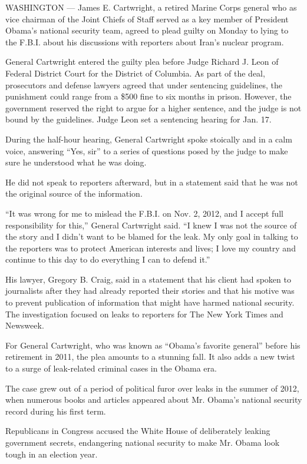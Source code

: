 WASHINGTON --- James E. Cartwright, a retired Marine Corps general who
as vice chairman of the Joint Chiefs of Staff served as a key member of
President Obama's national security team, agreed to plead guilty on
Monday to lying to the F.B.I. about his discussions with reporters about
Iran's nuclear program.

General Cartwright entered the guilty plea before Judge Richard J. Leon
of Federal District Court for the District of Columbia. As part of the
deal, prosecutors and defense lawyers agreed that under sentencing
guidelines, the punishment could range from a \$500 fine to six months
in prison. However, the government reserved the right to argue for a
higher sentence, and the judge is not bound by the guidelines. Judge
Leon set a sentencing hearing for Jan. 17.

During the half-hour hearing, General Cartwright spoke stoically and in
a calm voice, answering ``Yes, sir'' to a series of questions posed by
the judge to make sure he understood what he was doing.

He did not speak to reporters afterward, but in a statement said that he
was not the original source of the information.

``It was wrong for me to mislead the F.B.I. on Nov. 2, 2012, and I
accept full responsibility for this,'' General Cartwright said. ``I knew
I was not the source of the story and I didn't want to be blamed for the
leak. My only goal in talking to the reporters was to protect American
interests and lives; I love my country and continue to this day to do
everything I can to defend it.''

His lawyer, Gregory B. Craig, said in a statement that his client had
spoken to journalists after they had already reported their stories and
that his motive was to prevent publication of information that might
have harmed national security. The investigation focused on leaks to
reporters for The New York Times and Newsweek.

For General Cartwright, who was known as ``Obama's favorite general''
before his retirement in 2011, the plea amounts to a stunning fall. It
also adds a new twist to a surge of leak-related criminal cases in the
Obama era.

The case grew out of a period of political furor over leaks in the
summer of 2012, when numerous books and articles appeared about Mr.
Obama's national security record during his first term.

Republicans in Congress accused the White House of deliberately leaking
government secrets, endangering national security to make Mr. Obama look
tough in an election year.

